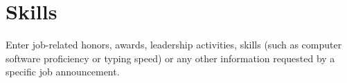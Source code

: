 
\section{Skills}

\parindent 0.0cm %
Enter job-related honors, awards, leadership activities, skills (such as computer software proficiency or typing speed) or any other information requested by a specific job announcement.